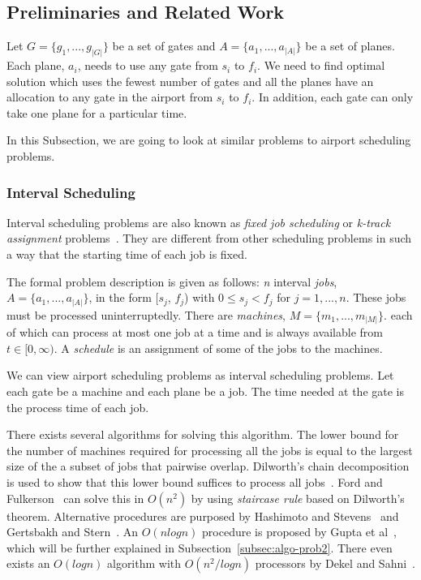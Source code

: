 \documentclass[11pt,a4paper]{article}
\begin{document}
\subsection{Preliminaries and Related Work}
\label{subsec:over-prel}
Let $G=\{g_1, ..., g_{|G|}\}$ be a set of gates and $A=\{a_1, ..., a_{|A|}\}$ be a set of planes. Each plane, $a_i$, needs to use any gate from $s_i$ to $f_i$. We need to find optimal solution which uses the fewest number of gates and all the planes have an allocation to any gate in the airport from $s_i$ to $f_i$. In addition, each gate can only take one plane for a particular time. \par
In this Subsection, we are going to look at similar problems to airport scheduling problems.

\subsubsection{Interval Scheduling}
Interval scheduling problems are also known as \textit{fixed job scheduling} or \textit{k-track assignment} problems~\cite{Lenstra2006}. They are different from other scheduling problems in such a way that the starting time of each job is fixed. \par
The formal problem description is given as follows: \textit{n} interval \textit{jobs}, $A = \{a_1, ..., a_{|A|}\}$, in the form [$s_j$, $f_j$) with $0 \leq s_j < f_j$ for $j = 1, ..., n$. These jobs must be processed uninterruptedly. There are \textit{machines}, $M=\{m_1, ..., m_{|M|}\}$. each of which can process at most one job at a time and is always available from $t \in [0, \infty)$. A \textit{schedule} is an assignment of some of the jobs to the machines. \par
We can view airport scheduling problems as interval scheduling problems. Let each gate be a machine and each plane be a job. The time needed at the gate is the process time of each job. \par
There exists several algorithms for solving this algorithm. The lower bound for the number of machines required for processing all the jobs is equal to the largest size of the a subset of jobs that pairwise overlap. Dilworth's chain decomposition is used to show that this lower bound suffices to process all jobs~\cite{Lenstra2006}. Ford and Fulkerson~\cite{FordL.r.1962} can solve this in $O(n^2)$ by using \textit{staircase rule} based on Dilworth's theorem. Alternative procedures are purposed by Hashimoto and Stevens~\cite{hashimoto1971wire} and Gertsbakh and Stern~\cite{gertsbakh1978minimal}. An $O(nlogn)$ procedure is proposed by Gupta et al~\cite{gupta1979optimal}, which will be further explained in Subsection~\ref{subsec:algo-prob2}. There even exists an $O(log n)$ algorithm with $O(n^2/log n)$ processors by Dekel and Sahni~\cite{dekel1983parallel}. \par
\end{document}
